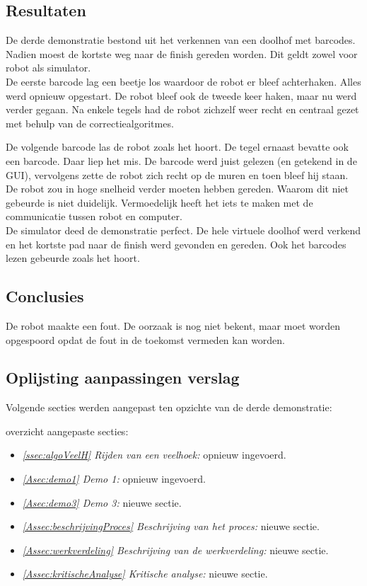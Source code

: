 \documentclass[eind]{penoverslag}
\begin{document}
\subsection{Resultaten} %
\label{Assec:result3}
De derde demonstratie bestond uit het verkennen van een doolhof met barcodes. Nadien moest de kortste weg naar de finish gereden worden. Dit geldt zowel voor robot als simulator.\\

De eerste barcode lag een beetje los waardoor de robot er bleef achterhaken. Alles werd opnieuw opgestart. De robot bleef ook de tweede keer haken, maar nu werd verder gegaan. Na enkele tegels had de robot zichzelf weer recht en centraal gezet met behulp van de correctiealgoritmes.

De volgende barcode las de robot zoals het hoort. De tegel ernaast bevatte ook een barcode. Daar liep het mis. De barcode werd juist gelezen (en getekend in de GUI), vervolgens zette de robot zich recht op de muren en toen bleef hij staan. De robot zou in hoge snelheid verder moeten hebben gereden. Waarom dit niet gebeurde is niet duidelijk. Vermoedelijk heeft het iets te maken met de communicatie tussen robot en computer.\\

De simulator deed de demonstratie perfect. De hele virtuele doolhof werd verkend en het kortste pad naar de finish werd gevonden en gereden. Ook het barcodes lezen gebeurde zoals het hoort.

\subsection{Conclusies} %
\label{Assec:conc3}
De robot maakte een fout. De oorzaak is nog niet bekent, maar moet worden opgespoord opdat de fout in de toekomst vermeden kan worden.

\subsection{Oplijsting aanpassingen verslag} %
\label{Assec:aanp3}
Volgende secties werden aangepast ten opzichte van de derde demonstratie:

overzicht aangepaste secties:
\begin{itemize}
	\item \textit{\ref{ssec:algoVeelH} Rijden van een veelhoek:} opnieuw ingevoerd.
	\item \textit{\ref{Asec:demo1} Demo 1:} opnieuw ingevoerd.
	\item \textit{\ref{Asec:demo3} Demo 3:} nieuwe sectie.
	\item \textit{\ref{Assec:beschrijvingProces} Beschrijving van het proces:} nieuwe sectie.
	\item \textit{\ref{Assec:werkverdeling} Beschrijving van de werkverdeling:} nieuwe sectie.
	\item \textit{\ref{Assec:kritischeAnalyse} Kritische analyse:} nieuwe sectie.
\end{itemize}
\end{document}
